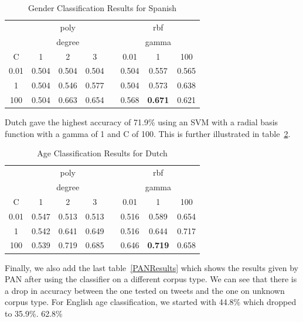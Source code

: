 \documentclass[conference]{IEEEtran}
\begin{document}
\begin{table}[!htbp]
\centering
\caption{Gender Classification Results for Spanish}
\label{SpanishGender}
\setlength{\tabcolsep}{0.5em}
{\renewcommand{\arraystretch}{1.2}%
\begin{tabular}{c|ccccccc}
\toprule
     & \multicolumn{3}{c}{poly}   &  & \multicolumn{3}{c}{rbf}        \\
     & \multicolumn{3}{c}{degree} &  & \multicolumn{3}{c}{gamma}      \\
C    & 1       & 2       & 3      &  & 0.01  & 1              & 100   \\
\midrule
0.01 & 0.504   & 0.504   & 0.504  &  & 0.504 & 0.557          & 0.565 \\
1    & 0.504   & 0.546   & 0.577  &  & 0.504 & 0.573          & 0.638 \\
100  & 0.504   & 0.663   & 0.654  &  & 0.568 & \textbf{0.671} & 0.621 \\
\bottomrule
\end{tabular}
}
\end{table}

Dutch gave the highest accuracy of 71.9\% using an SVM with a radial basis function with a gamma of 1 and C of 100. This is further illustrated in table~\ref{DutchAge}. 
\begin{table}[!htbp]
\centering
\caption{Age Classification Results for Dutch}
\label{DutchAge}
\setlength{\tabcolsep}{0.5em}
{\renewcommand{\arraystretch}{1.2}%
\begin{tabular}{c|ccccccc}
\toprule
     & \multicolumn{3}{c}{poly}   &  & \multicolumn{3}{c}{rbf}   \\
     & \multicolumn{3}{c}{degree} &  & \multicolumn{3}{c}{gamma} \\
C    & 1       & 2       & 3      &  & 0.01    & 1       & 100   \\
\midrule
0.01 & 0.547   & 0.513   & 0.513  &  & 0.516   & 0.589   & 0.654 \\
1    & 0.542   & 0.641   & 0.649  &  & 0.516   & 0.644   & 0.717 \\
100  & 0.539   & 0.719   & 0.685  &  & 0.646   & \textbf{0.719}   & 0.658 \\
\bottomrule
\end{tabular}
}
\end{table}

Finally, we also add the last table~\ref{PANResults} which shows the results given by PAN after using the classifier on a different corpus type. We can see that there is a drop in accuracy between the one tested on tweets and the one on unknown corpus type. For English age classification, we started with 44.8\% which dropped to 35.9\%. 62.8\%
\end{document}
